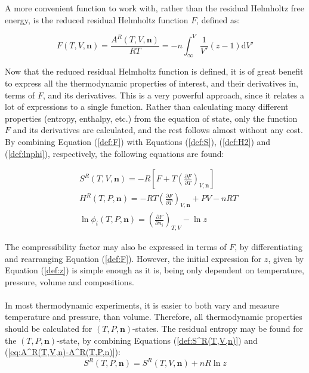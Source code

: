 \documentclass[internal,english]{sintefmemo2012}
\numberwithin{equation}{section}
\newcommand*{\pder}[2]{\left(\frac{\partial #1}{\partial #2}\right)}
\newcommand*{\reff}[1]{(\ref{#1})}
\begin{document}
A more convenient function to work with, rather than the residual Helmholtz free energy, is the reduced residual Helmholtz function $F$, defined as:

\begin{equation}
\label{def:F}
F(T,V,\textbf{n}) = \frac{A^R(T,V,\textbf{n})}{RT} = - n \int_\infty ^V \frac{1}{V'} (z-1) \mathrm{d}V'
\end{equation}

Now that the reduced residual Helmholtz function is defined, it is of great benefit to express all the thermodynamic properties of interest, and their derivatives in, terms of $F$, and its derivatives. This is a very powerful approach, since it relates a lot of expressions to a single function. Rather than calculating many different properties (entropy, enthalpy, etc.) from the equation of state, only the function $F$ and its derivatives are calculated, and the rest follows almost without any cost. By combining Equation \reff{def:F} with Equations \reff{def:S}, \reff{def:H2} and \reff{def:lnphi}, respectively, the following equations are found:

\begin{align}
\label{def:S^R(T,V,n)}
& S^R(T,V,\textbf{n}) = -R \left[F + T \pder{F}{T}_{V,\textbf{n}} \right] \\
\label{def:H^R(T,P,n)}
& H^R(T,P,\textbf{n}) = - RT \pder{F}{T}_{V,\textbf{n}} + PV - nRT \\
\label{def:lnphi(T,P,n)}
& \ln \phi_i (T,P,\textbf{n}) = \pder{F}{n_i}_{T,V} - \ln z
\end{align}

The compressibility factor may also be expressed in terms of $F$, by differentiating and rearranging Equation \reff{def:F}. However, the initial expression for $z$, given by Equation \reff{def:z} is simple enough as it is, being only dependent on temperature, pressure, volume and compositions.
\\ \\
In most thermodynamic experiments, it is easier to both vary and measure temperature and pressure, than volume. Therefore, all thermodynamic properties should be calculated for $(T,P,\textbf{n})$-states. The residual entropy may be found for the $(T,P,\textbf{n})$-state, by combining Equations \reff{def:S^R(T,V,n)} and \reff{eq:A^R(T,V,n)-A^R(T,P,n)}:
\begin{equation}
\label{def:S^R(T,P,n)}
S^R(T,P,\textbf{n}) = S^R(T,V,\textbf{n}) +nR \ln z
\end{equation}
\end{document}
